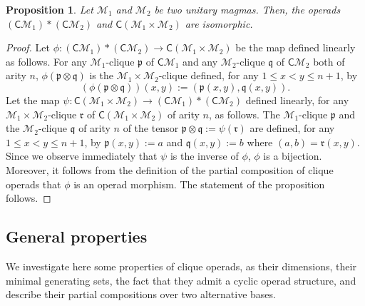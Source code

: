 \documentclass[10pt,reqno]{amsart}
\numberwithin{equation}{subsection}
\renewcommand{\leq}{\leqslant}
\newtheorem{Proposition}[Theorem]{Proposition}
\newcommand{\Mca}{\mathcal{M}}
\newcommand{\Pfr}{\mathfrak{p}}
\newcommand{\Qfr}{\mathfrak{q}}
\newcommand{\Rfr}{\mathfrak{r}}
\newcommand{\Cli}{\mathsf{C}}
\begin{document}
\begin{Proposition} \label{prop:Cli_M_Cartesian_product}
    Let $\Mca_1$ and $\Mca_2$ be two unitary magmas. Then, the operads
    $(\Cli\Mca_1) * (\Cli\Mca_2)$ and $\Cli(\Mca_1 \times \Mca_2)$ are
    isomorphic.
\end{Proposition}
\begin{proof}
    Let
    $\phi : (\Cli\Mca_1) * (\Cli\Mca_2) \to \Cli(\Mca_1 \times \Mca_2)$
    be the map defined linearly as follows. For any $\Mca_1$-clique
    $\Pfr$ of $\Cli\Mca_1$ and any $\Mca_2$-clique $\Qfr$ of $\Cli\Mca_2$
    both of arity $n$, $\phi(\Pfr \otimes \Qfr)$ is the
    $\Mca_1 \times \Mca_2$-clique defined, for any
    $1 \leq x < y \leq n + 1$, by
    \begin{equation}
        \left(\phi(\Pfr \otimes \Qfr)\right)(x, y)
        := (\Pfr(x, y), \Qfr(x, y)).
    \end{equation}
    Let the map
    $\psi : \Cli(\Mca_1 \times \Mca_2) \to (\Cli\Mca_1) * (\Cli\Mca_2)$
    defined linearly, for any $\Mca_1 \times \Mca_2$-clique $\Rfr$ of
    $\Cli(\Mca_1 \times \Mca_2)$ of arity $n$, as  follows. The
    $\Mca_1$-clique $\Pfr$ and the $\Mca_2$-clique $\Qfr$ of arity $n$
    of the tensor $\Pfr \otimes \Qfr := \psi(\Rfr)$ are defined, for any
    $1 \leq x < y \leq n + 1$, by $\Pfr(x, y) := a$ and
    $\Qfr(x, y) := b$ where $(a, b) = \Rfr(x, y)$. Since we observe
    immediately that $\psi$ is the inverse of $\phi$, $\phi$ is a
    bijection. Moreover, it follows from the definition of the partial
    composition of clique operads that $\phi$ is an operad morphism. The
    statement of the proposition follows.
\end{proof}
\medskip

\subsection{General properties}
We investigate here some properties of clique operads, as their
dimensions, their minimal generating sets, the fact that they admit a
cyclic operad structure, and describe their partial compositions over
two alternative bases.
\medskip

\end{document}
